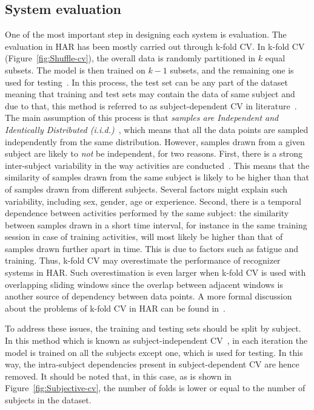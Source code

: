 \subsection{System evaluation}
\label{sub:CVs}
One of the most important step in designing each system is evaluation. The evaluation in HAR has been mostly carried out through k-fold CV. In k-fold CV (Figure~\ref{fig:Shuffle-cv}), the overall data is randomly partitioned in $k$ equal subsets. The model is then trained on $k-1$ subsets, and the remaining one is used for testing~\citep{trevor2009elements}. In this process, the test set can be any part of the dataset meaning that training and test sets may contain the data of same subject and due to that, this method is referred to as subject-dependent CV in literature~\cite{al2019deep}.  
The main assumption of this process is that \emph{samples are Independent and Identically Distributed (i.i.d.)}~\cite{arlot2010survey}, which means that all the data points are sampled independently from the same distribution.  However, samples drawn from a given subject are likely to \emph{not} be independent, for two reasons. First, there is a strong inter-subject variability in the way activities are conducted~\cite{bulling2014tutorial}. This means that the similarity of samples drawn from the same subject is likely to be higher than that of samples drawn from different subjects. Several factors might explain such variability, including sex, gender, age or experience. Second, there is a temporal dependence between activities performed by the same subject: the similarity between samples drawn in a short time interval, for instance in the same training session in case of training activities, will most likely be higher than that of samples drawn further apart in time. This is due to factors such as fatigue and training. Thus, k-fold CV may overestimate the performance of recognizer systems in HAR. Such overestimation is even larger when k-fold CV is used with overlapping sliding windows since the overlap between adjacent windows is another source of dependency between data points. A more formal discussion about the problems of k-fold CV in HAR can be found in~\cite{dehghani2019subject}.   


To address these issues, the training and testing sets should be split by subject. In this method which is known as subject-independent CV~\cite{al2019deep,janidarmian2017comprehensive}, in each iteration the model is trained on all the subjects except one, which is used for testing. In this way, the intra-subject dependencies present in subject-dependent CV are hence removed. It should be noted that, in this case, as is shown in Figure~\ref{fig:Subjective-cv}, the number of folds is lower or equal to the number of subjects in the dataset.    


